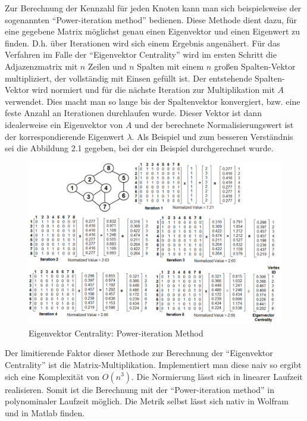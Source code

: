 \documentclass[a4paper,12pt,ngerman,chapterprefix=false,listof=totoc,bibliography=totoc]{scrreprt}
\begin{document}
{Zur Berechnung der Kennzahl für jeden Knoten kann man sich beispielsweise der sogenannten "`Power-iteration method"' bedienen. Diese Methode dient dazu, für eine gegebene Matrix möglichst genau einen Eigenvektor und einen Eigenwert zu finden. D.h. über Iterationen wird sich einem Ergebnis angenähert. Für das Verfahren im Falle der "`Eigenvektor Centrality"' wird im ersten Schritt die Adjazenzmatrix mit \(n\) Zeilen und \(n\) Spalten mit einem \(n\) großen Spalten-Vektor multipliziert, der vollständig mit Einsen gefüllt ist. Der entstehende Spalten-Vektor wird normiert und für die nächste Iteration zur Multiplikation mit \(A\) verwendet. Dies macht man so lange bis der Spaltenvektor konvergiert, bzw. eine feste Anzahl an Iterationen durchlaufen wurde. Dieser Vektor ist dann idealerweise ein Eigenvektor von \(A\) und der berechnete Normalisierungswert ist der korrespondierende Eigenwert \(\lambda\). Als Beispiel und zum besseren Verständnis sei die Abbildung 2.1 gegeben, bei der ein Beispiel durchgerechnet wurde. \cite{meghanathan_use_2015}
\begin{figure}[ht!]
	\centering
	\includegraphics[scale=.32]{Abbildungen/eigenvektor_centrality_example.png}
	\caption[Eigenvektor Centrality: Power-iteration Method \cite{meghanathan_use_2015}]{Eigenvektor Centrality: Power-iteration Method \cite{meghanathan_use_2015}}
\end{figure}
Der limitierende Faktor dieser Methode zur Berechnung der "`Eigenvektor Centrality"' ist die Matrix-Multiplikation. Implementiert man diese naiv so ergibt sich eine Komplexität von \(O(n^3)\). Die Normierung lässt sich in linearer Laufzeit realisieren. Somit ist die Berechnung mit der "`Power-iteration method"' in polynominaler Laufzeit möglich. Die Metrik selbst lässt sich nativ in Wolfram und in Matlab finden. \cite{wolfram_graph_2020,matlab_measure_2020}
}
\end{document}
